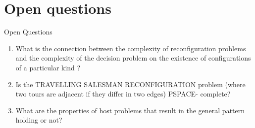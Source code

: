 \section{Open questions}
\begin{frame}{Open Questions}
  \begin{enumerate}
    \item What is the connection between the complexity of reconfiguration problems and the complexity of the decision problem on the existence of configurations of a particular kind ?
    \item Is the TRAVELLING SALESMAN RECONFIGURATION problem (where two tours are adjacent if they differ in two edges) PSPACE-
    complete?
    \item What are the properties of host problems that result in the general pattern holding or not?
  \end{enumerate}

\end{frame}
